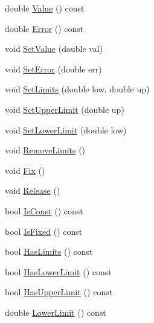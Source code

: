 \begin{DoxyCompactItemize}
\item 
double \mbox{\hyperlink{classROOT_1_1Minuit2_1_1MinuitParameter_ac77aed82006ba9e9598df49a1753d31c}{Value}} () const
\item 
double \mbox{\hyperlink{classROOT_1_1Minuit2_1_1MinuitParameter_af92997a2e9a7209fbddd286bbd1dbc3d}{Error}} () const
\item 
void \mbox{\hyperlink{classROOT_1_1Minuit2_1_1MinuitParameter_a535d59656c70ba8a0cc0ff196bac2d93}{Set\+Value}} (double val)
\item 
void \mbox{\hyperlink{classROOT_1_1Minuit2_1_1MinuitParameter_affa3dbe5755e6345181b98d168722a60}{Set\+Error}} (double err)
\item 
void \mbox{\hyperlink{classROOT_1_1Minuit2_1_1MinuitParameter_aeb1a61d3c007780ec388e11dd39274fc}{Set\+Limits}} (double low, double up)
\item 
void \mbox{\hyperlink{classROOT_1_1Minuit2_1_1MinuitParameter_a9e0c6225558635b19b5d10d0c6d9bb86}{Set\+Upper\+Limit}} (double up)
\item 
void \mbox{\hyperlink{classROOT_1_1Minuit2_1_1MinuitParameter_abf4e64af27e615b90fff7a21e2831488}{Set\+Lower\+Limit}} (double low)
\item 
void \mbox{\hyperlink{classROOT_1_1Minuit2_1_1MinuitParameter_a8c120aa76754c8c8209d0a8c78605137}{Remove\+Limits}} ()
\item 
void \mbox{\hyperlink{classROOT_1_1Minuit2_1_1MinuitParameter_ad0857ffbf012d785401c111cacc79085}{Fix}} ()
\item 
void \mbox{\hyperlink{classROOT_1_1Minuit2_1_1MinuitParameter_a9bf4bb232de53b61fc264c62b44d0b27}{Release}} ()
\item 
bool \mbox{\hyperlink{classROOT_1_1Minuit2_1_1MinuitParameter_afa82fc56a19c43531f469efc1fa34c2c}{Is\+Const}} () const
\item 
bool \mbox{\hyperlink{classROOT_1_1Minuit2_1_1MinuitParameter_a2d7f48ed0d6d1ac124e390e54df4de32}{Is\+Fixed}} () const
\item 
bool \mbox{\hyperlink{classROOT_1_1Minuit2_1_1MinuitParameter_a6319fe000027da162c4adad8782ef27b}{Has\+Limits}} () const
\item 
bool \mbox{\hyperlink{classROOT_1_1Minuit2_1_1MinuitParameter_a61b9c27aff1b1d7bf85bed898dd50dda}{Has\+Lower\+Limit}} () const
\item 
bool \mbox{\hyperlink{classROOT_1_1Minuit2_1_1MinuitParameter_a821e242fbbf23461e3b66a59126f3f02}{Has\+Upper\+Limit}} () const
\item 
double \mbox{\hyperlink{classROOT_1_1Minuit2_1_1MinuitParameter_a25c7f30fc42264f1df96a3852d2e11a4}{Lower\+Limit}} () const

\end{DoxyCompactItemize}
